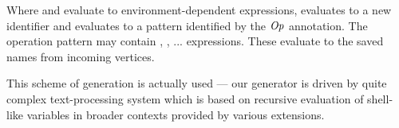 Where  and  evaluate to environment-dependent expressions,  evaluates to a new identifier and  evaluates to a pattern identified by the $\mf{op}$ annotation. The operation pattern may contain , , ... expressions. These evaluate to the saved names from incoming vertices.

This scheme of generation is actually used --- our generator is driven by quite complex text-processing system which is based on recursive evaluation of shell-like variables in broader contexts provided by various extensions.


